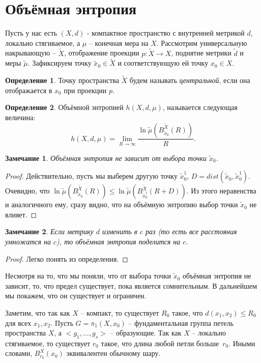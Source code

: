 \documentclass[11pt]{article}
\theoremstyle{definition}
\newtheorem{defin}{Определение}%
\theoremstyle{plain}
\theoremstyle{plain}
\newtheorem{remark}{Замечание}
\def\leq{\leqslant}
\def\wt#1{\widetilde{#1}}
\begin{document}
\section{Объёмная энтропия}
Пусть у нас есть $(X, d)$ - компактное пространство с внутренней метрикой $d$, локально стягиваемое, 
а $\mu$ -- конечная мера на $X$. Рассмотрим универсальную накрывающую -- $\wt{X}$, отображение проекции $p : \wt{X} \rightarrow X$, 
поднятие метрики $\wt{d}$ и меры $\wt{\mu}$.
Зафиксируем точку $\wt{x}_0 \in \wt{X}$ и соответствующую ей точку $x_0 \in X$.
\begin{defin}
Точку пространства $\wt{X}$  будем называть {\it центральной}, если она отображается в $x_0$ при проекции $p$.
\end{defin}

\begin{defin}
	Объёмной энтропией $h(X, d, \mu)$, называется следующая величина:
	$$
	h(X, d, \mu) = \lim_{R \rightarrow \infty} \frac{\ln\wt{\mu}\left(B_{\wt{x}_0}^{\wt{X}}(R)\right)} {R}.
	$$
\end{defin}


\begin{remark}
Объёмная энтропия не зависит от выбора точки $\wt{x}_0$.
\end{remark}
\begin{proof}
Действительно, пусть мы выберем другую точку $\wt{x}^1_0$, $D = dist(\wt{x}_0, \wt{x}_0^1)$.
Очевидно, что $\ln\wt{\mu}\left(B_{\wt{x}_0}^{\wt{X}}(R)\right) \leq 
\ln\wt{\mu}\left(B_{\wt{x}_0^1}^{\wt{X}}(R + D)\right)$. Из этого неравенства и аналогичного ему, сразу видно, 
что на объёмную энтропию выбор точки $\wt{x}_0$ не влияет.
\end{proof}

\begin{remark}
Если метрику $d$ изменить в $c$ раз (то есть все расстояния умножатся на $c$), то объёмная энтропия поделится на $c$.
\end{remark}
\begin{proof}
Легко понять из определения.
\end{proof}

Несмотря на то, что мы поняли, что от выбора точки $\wt{x}_0$ объёмная энтропия не зависит, 
то, что предел существует, пока является сомнительным. В дальнейшем мы покажем, что он существует и ограничен.

Заметим, что так как $X$ -- компакт, то существует $R_0$ такое, что $d(x_1, x_2) \leq R_0$ для всех $x_1, x_2$.
Пусть $G = \pi_1(X, x_0)$ -- фундаментальная группа петель пространства $X$, а $<g_1,\dots,g_s>$ -- образующие.
Так как $X$ -- локально стягиваемое, то существует $r_0$ такое, что длина любой петли больше~$r_0$. 
Иными словами, $B_{r_0}^X(x_0)$ эквивалентен обычному шару.
\end{document}
